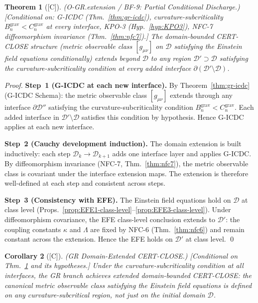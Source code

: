 \documentclass[12pt,oneside]{amsbook}
\theoremstyle{plain}
\newtheorem{theorem}{Theorem}[section]
\newtheorem{corollary}[theorem]{Corollary}
\theoremstyle{definition}
\theoremstyle{remark}
\newcommand{\status}[1]{\textup{[#1]}}
\begin{document}
\begin{theorem}[\status{C}]\label{thm:gr-bf9-partial}
\textup{(O-GR.extension / BF-9: Partial Conditional Discharge.)}
\textup{[Conditional on: G-ICDC (Thm.~\ref{thm:gr-icdc}),
curvature-subcriticality
$B_n^{\mathrm{grav}} < C_n^{\mathrm{grav}}$ at every interface,
KPO-3 (Hyp.~\ref{hyp:KPO3}), NFC-7 diffeomorphism invariance
(Thm.~\ref{thm:nfc7}).]}
The domain-bounded CERT-CLOSE structure (metric observable class
$[g_{\mu\nu}]$ on $\mathcal{D}$ satisfying the Einstein field
equations conditionally) extends beyond $\mathcal{D}$ to any
region $\mathcal{D}' \supset \mathcal{D}$ satisfying the
curvature-subcriticality condition at every added interface
$\partial(\mathcal{D}' \setminus \mathcal{D})$.
\end{theorem}

\begin{proof}
\textbf{Step~1 (G-ICDC at each new interface).}
By Theorem~\ref{thm:gr-icdc} (G-ICDC Schema): the metric
observable class $[g_{\mu\nu}]$ extends through any interface
$\partial\mathcal{D}''$ satisfying the curvature-subcriticality
condition $B_n^{\mathrm{grav}} < C_n^{\mathrm{grav}}$. Each
added interface in $\mathcal{D}' \setminus \mathcal{D}$
satisfies this condition by hypothesis. Hence G-ICDC applies
at each new interface.

\textbf{Step~2 (Cauchy development induction).}
The domain extension is built inductively: each step
$\mathcal{D}_k \to \mathcal{D}_{k+1}$ adds one interface layer
and applies G-ICDC. By diffeomorphism invariance (NFC-7,
Thm.~\ref{thm:nfc7}), the metric observable class is covariant
under the interface extension maps. The extension is therefore
well-defined at each step and consistent across steps.

\textbf{Step~3 (Consistency with EFE).}
The Einstein field equations hold on $\mathcal{D}$ at class level
(Props.~\ref{prop:EFE1-class-level}--\ref{prop:EFE3-class-level}).
Under diffeomorphism covariance, the EFE class-level conclusion
extends to $\mathcal{D}'$: the coupling constants $\kappa$ and $\Lambda$
are fixed by NFC-6 (Thm.~\ref{thm:nfc6}) and remain constant
across the extension. Hence the EFE holds on $\mathcal{D}'$
at class level. \qed
\end{proof}

\begin{corollary}[\status{C}]\label{cor:gr-near-close}
\textup{(GR Domain-Extended CERT-CLOSE.)}
\textup{[Conditional on Thm.~\ref{thm:gr-bf9-partial} and
its hypotheses.]}
Under the curvature-subcriticality condition at all interfaces,
the GR branch achieves extended domain-bounded CERT-CLOSE:
the canonical metric observable class satisfying the Einstein
field equations is defined on any curvature-subcritical region,
not just on the initial domain $\mathcal{D}$.
\end{corollary}
\end{document}
